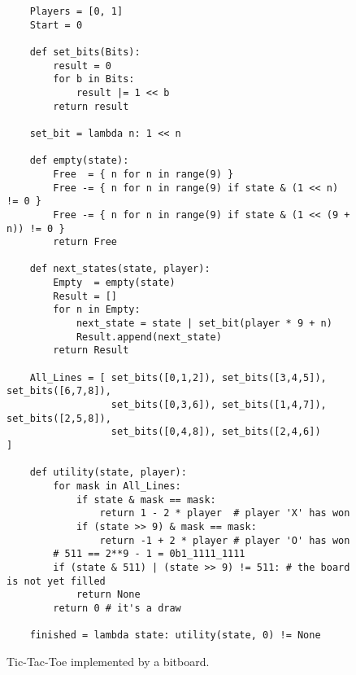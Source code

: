 \begin{figure}[!ht]
\centering
\begin{verbatim}
    Players = [0, 1]
    Start = 0
    
    def set_bits(Bits):
        result = 0
        for b in Bits:
            result |= 1 << b
        return result

    set_bit = lambda n: 1 << n

    def empty(state):
        Free  = { n for n in range(9) }
        Free -= { n for n in range(9) if state & (1 << n) != 0 }
        Free -= { n for n in range(9) if state & (1 << (9 + n)) != 0 }
        return Free

    def next_states(state, player):
        Empty  = empty(state)
        Result = []
        for n in Empty:
            next_state = state | set_bit(player * 9 + n)
            Result.append(next_state)
        return Result

    All_Lines = [ set_bits([0,1,2]), set_bits([3,4,5]), set_bits([6,7,8]), 
                  set_bits([0,3,6]), set_bits([1,4,7]), set_bits([2,5,8]), 
                  set_bits([0,4,8]), set_bits([2,4,6])                     ]

    def utility(state, player):
        for mask in All_Lines:
            if state & mask == mask:
                return 1 - 2 * player  # player 'X' has won
            if (state >> 9) & mask == mask:
                return -1 + 2 * player # player 'O' has won
        # 511 == 2**9 - 1 = 0b1_1111_1111  
        if (state & 511) | (state >> 9) != 511: # the board is not yet filled
            return None
        return 0 # it's a draw
    
    finished = lambda state: utility(state, 0) != None
\end{verbatim}
\vspace*{-0.3cm}
\caption{Tic-Tac-Toe implemented by a bitboard.}
\label{fig:Tic-Tac-Toe-Bitboard.ipynb}
\end{figure}
\FloatBarrier


